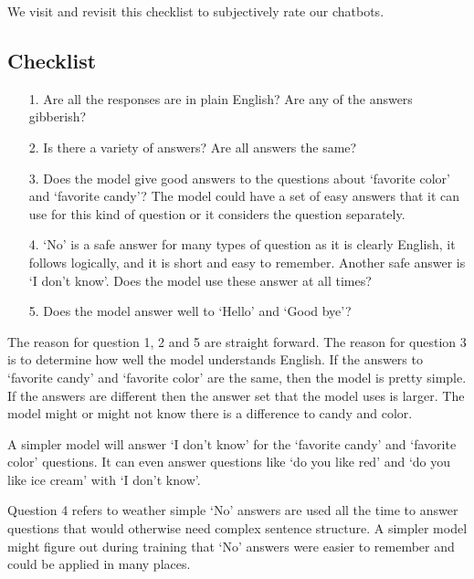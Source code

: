 We visit and revisit this checklist to subjectively rate our chatbots.

\subsection{Checklist} 

\begin{itemize}
	
	\item [1.] Are all the responses are in plain English? Are any of the answers gibberish?
	
	\item [2.] Is there a  variety of answers? Are all answers the same?
	
	\item [3.] Does the model give good answers to the questions about `favorite color' and `favorite candy'? The model could have a set of easy answers that it can use for this kind of question or it considers the question separately. 
	
	\item [4.] `No' is a safe answer for many types of question as it is clearly English, it follows logically, and it is short and easy to remember. Another safe answer is `I don't know'. Does the model use these answer at all times?
	
	\item [5.] Does the model answer well to `Hello' and `Good bye'?
	
\end{itemize}

The reason for question 1, 2 and 5 are straight forward. The reason for question 3 is to determine how well the model understands English. If the answers to `favorite candy' and `favorite color' are the same, then the model is pretty simple. If the answers are different then the answer set that the model uses is larger. The model might or might not know there is a difference to candy and color. %

A simpler model will answer `I don't know' for the `favorite candy' and `favorite color' questions. It can even answer questions like `do you like red' and `do you like ice cream' with `I don't know'. 

Question 4 refers to weather simple `No' answers are used all the time to answer questions that would otherwise need complex sentence structure. A simpler model might figure out during training that `No' answers were easier to remember and could be applied in many places.

